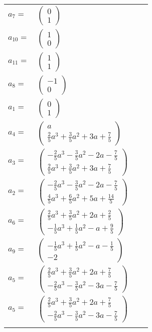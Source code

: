 \documentclass[1p]{elsarticle_modified}
\theoremstyle{definition}
\begin{document}
\begin{tabular}{m{7pt} m{180pt} m{7pt} m{180pt} }
\flushright $a_{7}=$&$\begin{pmatrix}0\\1\end{pmatrix}$ \\
\flushright $a_{10}=$&$\begin{pmatrix}1\\0\end{pmatrix}$ \\
\flushright $a_{11}=$&$\begin{pmatrix}1\\1\end{pmatrix}$ \\
\flushright $a_{8}=$&$\begin{pmatrix}-1\\0\end{pmatrix}$ \\
\flushright $a_{1}=$&$\begin{pmatrix}0\\1\end{pmatrix}$ \\
\flushright $a_{4}=$&$\begin{pmatrix}a\\\frac{2}{5} a^3+\frac{3}{5} a^2+3 a+\frac{7}{5}\end{pmatrix}$ \\
\flushright $a_{3}=$&$\begin{pmatrix}-\frac{2}{5} a^3-\frac{3}{5} a^2-2 a-\frac{7}{5}\\\frac{2}{5} a^3+\frac{3}{5} a^2+3 a+\frac{7}{5}\end{pmatrix}$ \\
\flushright $a_{2}=$&$\begin{pmatrix}-\frac{2}{5} a^3-\frac{3}{5} a^2-2 a-\frac{7}{5}\\\frac{4}{5} a^3+\frac{6}{5} a^2+5 a+\frac{14}{5}\end{pmatrix}$ \\
\flushright $a_{6}=$&$\begin{pmatrix}\frac{2}{5} a^3+\frac{3}{5} a^2+2 a+\frac{2}{5}\\-\frac{1}{5} a^3+\frac{1}{5} a^2- a+\frac{9}{5}\end{pmatrix}$ \\
\flushright $a_{9}=$&$\begin{pmatrix}-\frac{1}{5} a^3+\frac{1}{5} a^2- a-\frac{1}{5}\\-2\end{pmatrix}$ \\
\flushright $a_{5}=$&$\begin{pmatrix}\frac{2}{5} a^3+\frac{3}{5} a^2+2 a+\frac{7}{5}\\-\frac{2}{5} a^3-\frac{3}{5} a^2-3 a-\frac{7}{5}\end{pmatrix}$\\ \flushright $a_{5}=$&$\begin{pmatrix}\frac{2}{5} a^3+\frac{3}{5} a^2+2 a+\frac{7}{5}\\-\frac{2}{5} a^3-\frac{3}{5} a^2-3 a-\frac{7}{5}\end{pmatrix}$\\&\end{tabular}
\end{document}
